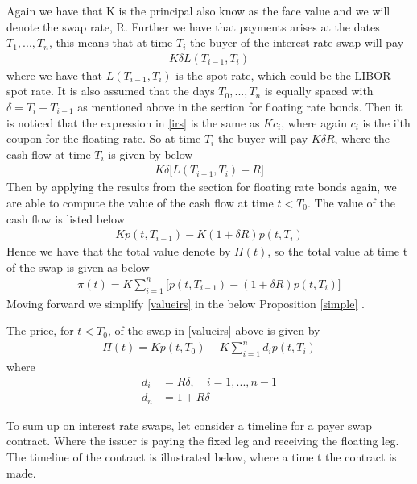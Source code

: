 \noindent
Again we have that K is the principal also know as the face value and we will denote the swap rate, R.
Further we have that payments
arises at the dates $T_1,...,T_n$, this means that at time $T_i$ the buyer of the interest rate swap will pay
\begin{align}
    K \delta L(T_{i-1},T_i)
    \label{irs}
\end{align}
where we have that $L(T_{i-1},T_i)$ is the spot rate, which could be the LIBOR spot rate.
It is also assumed
that the days $T_0,...,T_n$ is equally spaced with $\delta = T_i - T_{i-1}$ as mentioned above in the section for floating rate bonds. 
Then it is noticed that the expression in \autoref{irs} is the same as $Kc_i$, where again $c_i$ is the i'th coupon for the floating rate. 
So at time $T_i$ the buyer will pay $K \delta R$, where the cash flow at time $T_i$ is given by below
\begin{align*}
    K \delta \Big[L(T_{i-1},T_i)-R \Big]
\end{align*}
Then by applying the results from the section for floating rate bonds again, we are able to compute the value of the 
cash flow at time $t<T_0$. The value of the cash flow is listed below
\begin{align*}
    K p(t,T_{i-1})-K(1+\delta R)p(t,T_i)
\end{align*}
Hence we have that the total value denote by $\Pi(t)$, so the total value at time t of the swap is given as below
\begin{align}
    \pi (t) = K \sum_{i=1}^{n} \Big[p(t,T_{i-1})-(1+ \delta R)p(t,T_i)\Big]
    \label{valueirs}
\end{align}
Moving forward we simplify \autoref{valueirs} in the below Proposition \ref{simple} \cite{Bjork}.
\begin{proposition}
    The price, for $t<T_0$, of the swap in \autoref{valueirs} above
    is given by 
    \begin{align*}
        \Pi(t) = K p(t,T_0)-K \sum_{i=1}^{n}d_i p(t,T_i)
    \end{align*}
    where
    \begin{align*}
        d_i &= R \delta, \quad i=1,...,n-1 \\
        d_n &= 1+ R \delta
    \end{align*}
    \label{simple}
\end{proposition}
\noindent 
To sum up on interest rate swaps, let consider a timeline for a payer swap contract. Where the issuer is paying the fixed leg 
and receiving the floating leg. The timeline of the contract is illustrated below, where a time t the contract is made. 
